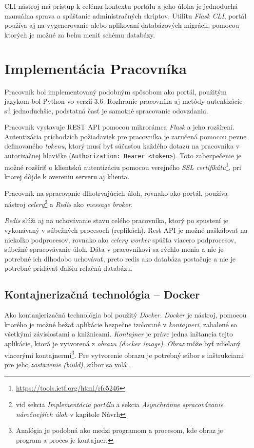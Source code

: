 \documentclass[
  digital, %
  twoside, %
  table,   %
  lof,     %
  lot,     %
]{fithesis3}
\begin{document}
CLI nástroj má prístup k celému kontextu portálu a jeho úloha je jednoduchá manuálna sprava a spúšťanie administračných skriptov. Utilitu \emph{Flask CLI}, portál používa aj na vygenerovanie alebo aplikovaní databázových migrácii, pomocou ktorých je možné za behu meniť schému databázy. 

\section{Implementácia Pracovníka}

Pracovník bol implementovaný podobným spôsobom ako portál, použitým jazykom bol Python vo verzii 3.6. Rozhranie pracovníka aj metódy autentizácie sú jednoduchšie, podstatná časť je samotné spracovanie odovzdania.

Pracovník vystavuje REST API pomocou mikrorámca \emph{Flask} a jeho rozšírení. 
Autentizácia príchodzích požiadaviek pre pracovníka je zaručená pomocou pevne definovaného \emph{tokenu}, ktorý musí byť súčasťou každého dotazu na pracovníka v autorizačnej hlavičke (\texttt{Authorization: Bearer <token>}). Toto zabezpečenie je možné rozšíriť o klientskú autentizáciu pomocou verejného \emph{SSL certifikátu}\footnote{\url{https://tools.ietf.org/html/rfc5246}}, pri ktorej dôjde k overeniu serveru aj klienta. 

Pracovník na spracovanie dlhotrvajúcich úloh, rovnako ako portál, používa nástroj \emph{celery}\footnote{vid sekcia \emph{Implementácia portálu} a sekcia \emph{Asynchrónne spracovávanie náročnejších úloh} v kapitole Návrh} a \emph{Redis} ako \emph{message broker}. 

\emph{Redis} slúži aj na uchovávanie stavu celého pracovníka, ktorý po spustení je vykonávaný v súbežných procesoch (replikách). Rest API je možné naškálovať na niekoľko podprocesov, rovnako ako \emph{celery worker} spúšťa viacero podprocesov, súbežné spracovávanie úloh. Dáta v pracovníkovi sa rýchlo menia a nie je potrebné ich dlhodobo uchovávať, preto redis ako databáza postačuje a nie je potrebné pridávať ďalšiu relačnú databázu.

\subsection{Kontajnerizačná technológia -- Docker}

Ako kontanjerizačná technológia bol použitý \emph{Docker}. \emph{Docker} je nástroj, pomocou ktorého je možné bežať aplikácie bezpečne izolované v \emph{kontajneri}, zabalené so všetkými závislosťami a knižnicami. \emph{Kontajner} je práve jedna inštancia tejto aplikácie, ktorá je vytvorená z \emph{obrazu (docker image)}. \emph{Obraz} môže byť zdieľaný viacerými kontajnermi\footnote{Analógia je podobná ako medzi programom a procesom, kde obraz je program a proces je kontajner.}. Pre vytvorenie obrazu je potrebný súbor s inštrukciami pre jeho \emph{zostavenie (build)}, súbor sa volá .
\end{document}
